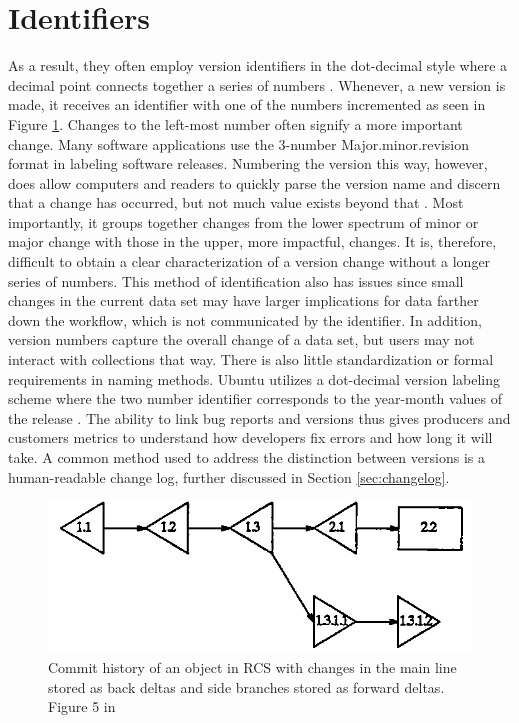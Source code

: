\section{Identifiers}

As a result, they often employ version identifiers in the dot-decimal style where a decimal point connects together a series of numbers \cite{Stuckenholz:2005:CEV:1039174.1039197}.
Whenever, a new version is made, it receives an identifier with one of the numbers incremented as seen in Figure \ref{RCSTree}.
Changes to the left-most number often signify a more important change.
Many software applications use the 3-number Major.minor.revision format in labeling software releases.
Numbering the version this way, however, does allow computers and readers to quickly parse the version name and discern that a change has occurred, but not much value exists beyond that \cite{Dijkstra1994}.
Most importantly, it groups together changes from the lower spectrum of minor or major change with those in the upper, more impactful, changes.
It is, therefore, difficult to obtain a clear characterization of a version change without a longer series of numbers.
This method of identification also has issues since small changes in the current data set may have larger implications for data farther down the workflow, which is not communicated by the identifier.
In addition, version numbers capture the overall change of a data set, but users may not interact with collections that way.
There is also little standardization or formal requirements in naming methods.
Ubuntu utilizes a dot-decimal version labeling scheme where the two number identifier corresponds to the year-month values of the release \cite{Ubuntu}.
The ability to link bug reports and versions thus gives producers and customers metrics to understand how developers fix errors and how long it will take.
A common method used to address the distinction between versions is a human-readable change log, further discussed in Section \ref{sec:changelog}.


\begin{figure}
	\centering
	\includegraphics[scale=0.75]{figures/RCSCommitTree.png}
	\caption[Commit history of an object in RCS with changes in the main line stored as back deltas and side branches stored as forward deltas.]{Commit history of an object in RCS with changes in the main line stored as back deltas and side branches stored as forward deltas.  Figure 5 in \cite{tichy1985rcs}}
	\label{RCSTree}
\end{figure}


